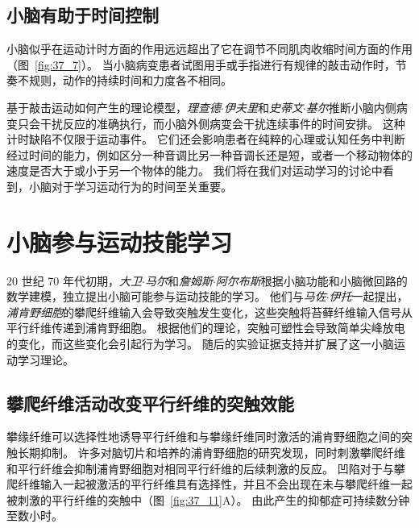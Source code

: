 \subsection{小脑有助于时间控制}

小脑似乎在运动计时方面的作用远远超出了它在调节不同肌肉收缩时间方面的作用（图~\ref{fig:37_7}）。
当小脑病变患者试图用手或手指进行有规律的敲击动作时，节奏不规则，动作的持续时间和力度各不相同。


基于敲击运动如何产生的理论模型，\textit{理查德$\cdot$伊夫里}和\textit{史蒂文$\cdot$基尔}推断小脑内侧病变只会干扰反应的准确执行，而小脑外侧病变会干扰连续事件的时间安排。
这种计时缺陷不仅限于运动事件。
它们还会影响患者在纯粹的心理或认知任务中判断经过时间的能力，例如区分一种音调比另一种音调长还是短，或者一个移动物体的速度是否大于或小于另一个物体的能力。
我们将在我们对运动学习的讨论中看到，小脑对于学习运动行为的时间至关重要。



\section{小脑参与运动技能学习}

20 世纪 70 年代初期，\textit{大卫$\cdot$马尔}和\textit{詹姆斯$\cdot$阿尔布斯}根据小脑功能和小脑微回路的数学建模，独立提出小脑可能参与运动技能的学习。
他们与\textit{马佐$\cdot$伊托}一起提出，\textit{浦肯野细胞}的攀爬纤维输入会导致突触发生变化，这些突触将苔藓纤维输入信号从平行纤维传递到浦肯野细胞。
根据他们的理论，突触可塑性会导致简单尖峰放电的变化，而这些变化会引起行为学习。
随后的实验证据支持并扩展了这一小脑运动学习理论。



\subsection{攀爬纤维活动改变平行纤维的突触效能}

攀缘纤维可以选择性地诱导平行纤维和与攀缘纤维同时激活的浦肯野细胞之间的突触长期抑制。
许多对脑切片和培养的浦肯野细胞的研究发现，同时刺激攀爬纤维和平行纤维会抑制浦肯野细胞对相同平行纤维的后续刺激的反应。
凹陷对于与攀爬纤维输入一起被激活的平行纤维具有选择性，并且不会出现在未与攀爬纤维一起被刺激的平行纤维的突触中（图~\ref{fig:37_11}A）。
由此产生的抑郁症可持续数分钟至数小时。


